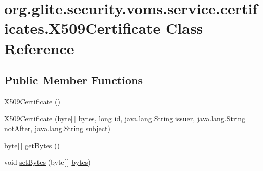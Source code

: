 \hypertarget{classorg_1_1glite_1_1security_1_1voms_1_1service_1_1certificates_1_1X509Certificate}{
\section{org.glite.security.voms.service.certificates.X509Certificate Class Reference}
\label{classorg_1_1glite_1_1security_1_1voms_1_1service_1_1certificates_1_1X509Certificate}
}
\subsection*{Public Member Functions}
\begin{DoxyCompactItemize}
\item 
\hyperlink{classorg_1_1glite_1_1security_1_1voms_1_1service_1_1certificates_1_1X509Certificate_ab2dff550edcf0827cce6120f5ceca6ff}{X509Certificate} ()
\item 
\hyperlink{classorg_1_1glite_1_1security_1_1voms_1_1service_1_1certificates_1_1X509Certificate_ac6ad0b74bbe585a199a2997fb53d69e2}{X509Certificate} (byte\mbox{[}$\,$\mbox{]} \hyperlink{classorg_1_1glite_1_1security_1_1voms_1_1service_1_1certificates_1_1X509Certificate_a633565ab1518573f1ccd3aafac7c025d}{bytes}, long \hyperlink{classorg_1_1glite_1_1security_1_1voms_1_1service_1_1certificates_1_1X509Certificate_adb9d391bfa7d8329d3231f75ee989264}{id}, java.lang.String \hyperlink{classorg_1_1glite_1_1security_1_1voms_1_1service_1_1certificates_1_1X509Certificate_a77330c6d98cf740cd9bc094b386c4247}{issuer}, java.lang.String \hyperlink{classorg_1_1glite_1_1security_1_1voms_1_1service_1_1certificates_1_1X509Certificate_aef72b7697d657017ee1ab929089cfd0a}{notAfter}, java.lang.String \hyperlink{classorg_1_1glite_1_1security_1_1voms_1_1service_1_1certificates_1_1X509Certificate_a36270b55a287194a45068375ad65723e}{subject})
\item 
byte\mbox{[}$\,$\mbox{]} \hyperlink{classorg_1_1glite_1_1security_1_1voms_1_1service_1_1certificates_1_1X509Certificate_aa790f47b89f5e2258ca0fd2f612ba0e7}{getBytes} ()
\item 
void \hyperlink{classorg_1_1glite_1_1security_1_1voms_1_1service_1_1certificates_1_1X509Certificate_a2c15110e4af16cdb0e50417972a1a530}{setBytes} (byte\mbox{[}$\,$\mbox{]} \hyperlink{classorg_1_1glite_1_1security_1_1voms_1_1service_1_1certificates_1_1X509Certificate_a633565ab1518573f1ccd3aafac7c025d}{bytes})
\item 

\end{DoxyCompactItemize}
